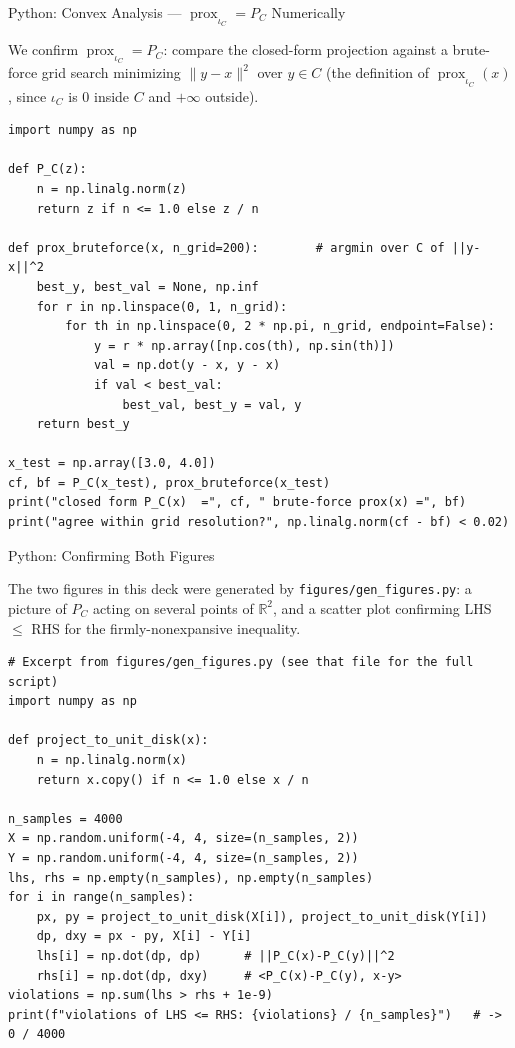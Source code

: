 \documentclass[aspectratio=169,10pt]{beamer}
\newcommand{\R}{\mathbb{R}}
\begin{document}
\begin{frame}[fragile]{Python: Convex Analysis --- $\operatorname{prox}_{\iota_C} = P_C$ Numerically}

We confirm $\operatorname{prox}_{\iota_C} = P_C$: compare the closed-form
projection against a brute-force grid search minimizing $\|y-x\|^2$ over
$y \in C$ (the definition of $\operatorname{prox}_{\iota_C}(x)$, since
$\iota_C$ is $0$ inside $C$ and $+\infty$ outside).

\begin{lstlisting}[style=pycode]
import numpy as np

def P_C(z):
    n = np.linalg.norm(z)
    return z if n <= 1.0 else z / n

def prox_bruteforce(x, n_grid=200):        # argmin over C of ||y-x||^2
    best_y, best_val = None, np.inf
    for r in np.linspace(0, 1, n_grid):
        for th in np.linspace(0, 2 * np.pi, n_grid, endpoint=False):
            y = r * np.array([np.cos(th), np.sin(th)])
            val = np.dot(y - x, y - x)
            if val < best_val:
                best_val, best_y = val, y
    return best_y

x_test = np.array([3.0, 4.0])
cf, bf = P_C(x_test), prox_bruteforce(x_test)
print("closed form P_C(x)  =", cf, " brute-force prox(x) =", bf)
print("agree within grid resolution?", np.linalg.norm(cf - bf) < 0.02)
\end{lstlisting}

\end{frame}

\begin{frame}[fragile]{Python: Confirming Both Figures}

The two figures in this deck were generated by \texttt{figures/gen\_figures.py}:
a picture of $P_C$ acting on several points of $\R^2$, and a scatter plot
confirming LHS $\le$ RHS for the firmly-nonexpansive inequality.

\begin{lstlisting}[style=pycode]
# Excerpt from figures/gen_figures.py (see that file for the full script)
import numpy as np

def project_to_unit_disk(x):
    n = np.linalg.norm(x)
    return x.copy() if n <= 1.0 else x / n

n_samples = 4000
X = np.random.uniform(-4, 4, size=(n_samples, 2))
Y = np.random.uniform(-4, 4, size=(n_samples, 2))
lhs, rhs = np.empty(n_samples), np.empty(n_samples)
for i in range(n_samples):
    px, py = project_to_unit_disk(X[i]), project_to_unit_disk(Y[i])
    dp, dxy = px - py, X[i] - Y[i]
    lhs[i] = np.dot(dp, dp)      # ||P_C(x)-P_C(y)||^2
    rhs[i] = np.dot(dp, dxy)     # <P_C(x)-P_C(y), x-y>
violations = np.sum(lhs > rhs + 1e-9)
print(f"violations of LHS <= RHS: {violations} / {n_samples}")   # -> 0 / 4000
\end{lstlisting}

\end{frame}
\end{document}
